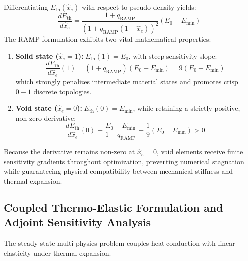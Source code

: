 \documentclass[11pt, a4paper]{article}
\begin{document}
Differentiating $E_{\text{th}}(\hat{x}_e)$ with respect to pseudo-density yields:
\begin{equation}
\frac{dE_{\text{th}}}{d\hat{x}_e} = \frac{1 + q_{\text{RAMP}}}{\left(1 + q_{\text{RAMP}}(1 - \hat{x}_e)\right)^2} (E_0 - E_{\min})
\end{equation}
The RAMP formulation exhibits two vital mathematical properties:
\begin{enumerate}
    \item \textbf{Solid state ($\hat{x}_e = 1$):} $E_{\text{th}}(1) = E_0$, with steep sensitivity slope:
    \begin{equation}
    \frac{dE_{\text{th}}}{d\hat{x}_e}(1) = (1 + q_{\text{RAMP}})(E_0 - E_{\min}) = 9(E_0 - E_{\min})
    \end{equation}
    which strongly penalizes intermediate material states and promotes crisp $0-1$ discrete topologies.
    \item \textbf{Void state ($\hat{x}_e = 0$):} $E_{\text{th}}(0) = E_{\min}$, while retaining a strictly positive, non-zero derivative:
    \begin{equation}
    \frac{dE_{\text{th}}}{d\hat{x}_e}(0) = \frac{E_0 - E_{\min}}{1 + q_{\text{RAMP}}} = \frac{1}{9}(E_0 - E_{\min}) > 0
    \end{equation}
\end{enumerate}
Because the derivative remains non-zero at $\hat{x}_e = 0$, void elements receive finite sensitivity gradients throughout optimization, preventing numerical stagnation while guaranteeing physical compatibility between mechanical stiffness and thermal expansion.

\subsection{Coupled Thermo-Elastic Formulation and Adjoint Sensitivity Analysis}
\label{sec:thermoelastic}
The steady-state multi-physics problem couples heat conduction with linear elasticity under thermal expansion.
\end{document}

